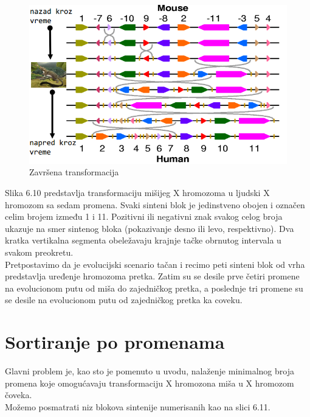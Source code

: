 \begin{figure}[h!]
\centering
\includegraphics[scale=0.32]{poglavlja/6/slike/niz7.png}
\caption{Završena transformacija}
\end{figure}

\newpage
Slika 6.10 predstavlja transformaciju mišijeg X hromozoma u ljudski X hromozom sa sedam promena. Svaki sinteni blok je jedinstveno obojen i označen celim brojem između 1 i 11. Pozitivni ili negativni znak svakog celog broja ukazuje na smer sintenog bloka (pokazivanje desno ili levo, respektivno). Dva kratka vertikalna segmenta obeležavaju krajnje tačke obrnutog intervala u svakom preokretu.\\

Pretpostavimo da je evolucijski scenario tačan i recimo peti sinteni blok od vrha predstavlja uređenje hromozoma pretka. Zatim su se desile prve četiri promene na evolucionom putu od miša do zajedničkog pretka, a poslednje tri promene su se desile na evolucionom putu od zajedničkog pretka ka coveku.

\newpage
\section{Sortiranje po promenama}

\hspace{0.7cm} Glavni problem je, kao sto je pomenuto u uvodu, nalaženje minimalnog broja promena koje omogućavaju transformaciju X hromozona miša u X hromozom čoveka.\\

\noindent Možemo posmatrati niz blokova sintenije numerisanih kao na slici 6.11.\\

